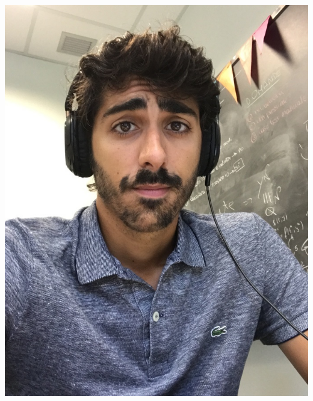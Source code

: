 \documentclass[
  usegeometry%
]{scrartcl}
\begin{document}
\pagestyle{plain}


\begin{cv}{}\vspace{1.5em} %

\vspace{5.5em}

\begin{marginfigure}%
\includegraphics[width=\marginparwidth]{photo_profile.jpg}
\end{marginfigure}


\end{cv}
\end{document}
